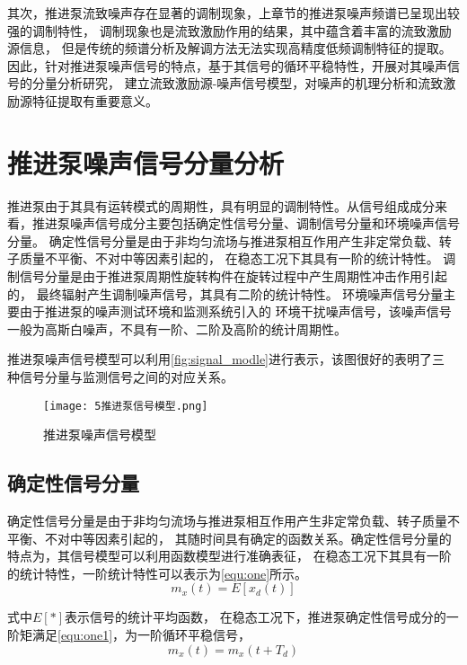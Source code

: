 其次，推进泵流致噪声存在显著的调制现象，上章节的推进泵噪声频谱已呈现出较强的调制特性，
调制现象也是流致激励作用的结果，其中蕴含着丰富的流致激励源信息，
但是传统的频谱分析及解调方法无法实现高精度低频调制特征的提取。
因此，针对推进泵噪声信号的特点，基于其信号的循环平稳特性，开展对其噪声信号的分量分析研究，
建立流致激励源-噪声信号模型，对噪声的机理分析和流致激励源特征提取有重要意义。
\section{推进泵噪声信号分量分析}
推进泵由于其具有运转模式的周期性，具有明显的调制特性。从信号组成成分来看，推进泵噪声信号成分主要包括确定性信号分量、调制信号分量和环境噪声信号分量。
确定性信号分量是由于非均匀流场与推进泵相互作用产生非定常负载、转子质量不平衡、不对中等因素引起的，
在稳态工况下其具有一阶的统计特性。
调制信号分量是由于推进泵周期性旋转构件在旋转过程中产生周期性冲击作用引起的，
最终辐射产生调制噪声信号，其具有二阶的统计特性。
环境噪声信号分量主要由于推进泵的噪声测试环境和监测系统引入的
环境干扰噪声信号，该噪声信号一般为高斯白噪声，不具有一阶、二阶及高阶的统计周期性。

推进泵噪声信号模型可以利用\autoref{fig:signal_modle}进行表示，该图很好的表明了三
种信号分量与监测信号之间的对应关系。
\begin{figure}[htbp]
    \centering
    \texttt{[image: 5推进泵信号模型.png]}
    \caption{\label{fig:signal_modle}推进泵噪声信号模型}
\end{figure}

\subsection{确定性信号分量}
确定性信号分量是由于非均匀流场与推进泵相互作用产生非定常负载、转子质量不平衡、不对中等因素引起的，
其随时间具有确定的函数关系。确定性信号分量的特点为，其信号模型可以利用函数模型进行准确表征，
在稳态工况下其具有一阶的统计特性，一阶统计特性可以表示为\autoref{equ:one}所示。
\begin{equation}
    \label{equ:one}
    m_{x}\left ( t \right ) =E\left [ x_{d}\left ( t   \right )  \right ]
\end{equation}

式中$E[*]$表示信号的统计平均函数，
在稳态工况下，推进泵确定性信号成分的一阶矩满足\autoref{equ:one1}，为一阶循环平稳信号，
\begin{equation}
    \label{equ:one1}
    m_{x}\left ( t \right ) =m_{x}\left ( t+T_d \right )
\end{equation}

